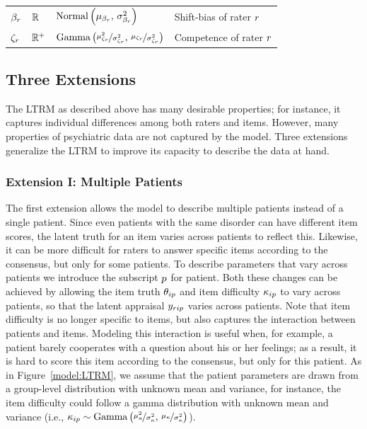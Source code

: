 \documentclass[a4paper,usenames,dvipsnames]{article}
\newenvironment{revision}{\color{teal}}{\color{black}}
\begin{document}
\begin{revision}
\begin{table}[!ht]
\begin{tabular}{llll}
	$\beta_r      		$&$	\mathbb{R}			$&$\text{Normal}\left(\mu_{\beta_r},\,\sigma_{\beta_r}^2\right) $&
	Shift-bias of rater $r$\\

	$\zeta_r 		$&$	\mathbb{R}^+	$&$\text{Gamma}\left(\nicefrac{\mu_{\zeta_r}^2}{\sigma_{\zeta_r}^2},\,\nicefrac{\mu_{\zeta_r}}{\sigma_{\zeta_r}^2}\right) $&
	Competence of rater $r$\\

	\bottomrule

	\end{tabular}

\end{table}

\end{revision}


\subsection*{Three Extensions}

The LTRM as described above has many desirable properties; for instance, it captures individual differences among both raters and items. However, many properties of psychiatric data are not captured by the model. Three extensions generalize the LTRM to improve its capacity to describe the data at hand.

\subsubsection*{Extension I: Multiple Patients}
The first extension allows the model to describe multiple patients instead of a single patient. Since even patients with the same disorder can have different item scores, the latent truth for an item varies across patients to reflect this. \begin{revision}Likewise, it can be\end{revision} more difficult for raters to answer specific items according to the consensus, but only for some patients. To describe parameters that vary across patients we introduce the subscript $p$ for patient. Both these changes can be achieved by allowing the item truth $\theta_{ip}$ and item difficulty $\kappa_{ip}$ to vary across patients, so that the latent appraisal $y_{rip}$ varies across patients. Note that item difficulty is no longer specific to items, but also captures the interaction between patients and items. Modeling this interaction is useful when, for example, a patient barely cooperates with a question about his or her feelings; as a result, it is hard to score this item according to the consensus, but only for this patient. As in Figure~\ref{model:LTRM}, we assume that the patient parameters are drawn from a group-level distribution with unknown mean and variance, for instance, the item difficulty could follow a gamma distribution with unknown mean and variance (i.e., $\kappa_{ip} \sim \text{Gamma}\left(\nicefrac{\mu_\kappa^2}{\sigma_\kappa^2},\,\nicefrac{\mu_\kappa}{\sigma_\kappa^2}\right)$).
\end{document}
